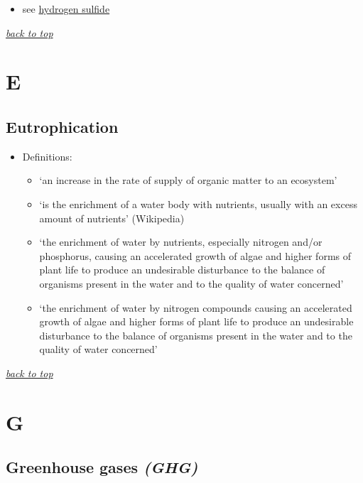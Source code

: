 \documentclass[]{book}
\providecommand{\tightlist}{%
  \setlength{\itemsep}{0pt}\setlength{\parskip}{0pt}}
\theoremstyle{definition}
\theoremstyle{definition}
\theoremstyle{definition}
\theoremstyle{remark}
\begin{document}
\begin{itemize}
\tightlist
\item
  see \protect\hyperlink{H2S}{hydrogen sulfide}
\end{itemize}

\emph{\protect\hyperlink{top}{back to top}}

\section{E}\label{e}

\hypertarget{eutrophication}{\subsection{Eutrophication}\label{eutrophication}}

\begin{itemize}
\tightlist
\item
  Definitions:

  \begin{itemize}
  \tightlist
  \item
    `an increase in the rate of supply of organic matter to an
    ecosystem' \citep{Nixon1995-th}
  \item
    `is the enrichment of a water body with nutrients, usually with an
    excess amount of nutrients' (Wikipedia)
  \item
    `the enrichment of water by nutrients, especially nitrogen and/or
    phosphorus, causing an accelerated growth of algae and higher forms
    of plant life to produce an undesirable disturbance to the balance
    of organisms present in the water and to the quality of water
    concerned' \citep{Anonymous1991-ho}
  \item
    `the enrichment of water by nitrogen compounds causing an
    accelerated growth of algae and higher forms of plant life to
    produce an undesirable disturbance to the balance of organisms
    present in the water and to the quality of water concerned'
    \citep{Anonymous1991-xb}
  \end{itemize}
\end{itemize}

\emph{\protect\hyperlink{top}{back to top}}

\section{G}\label{g}

\subsection{\texorpdfstring{Greenhouse gases
\emph{(GHG)}}{Greenhouse gases (GHG)}}\label{greenhouse-gases-ghg}
\end{document}
